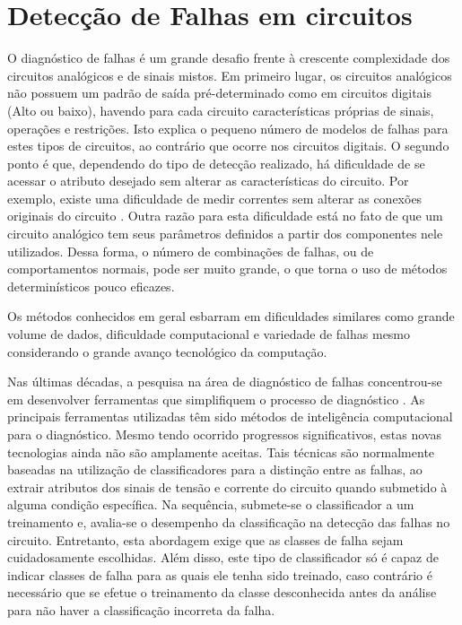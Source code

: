 
\chapter{Detecção de Falhas em circuitos}

O diagnóstico de falhas é um grande desafio frente à crescente complexidade dos circuitos analógicos e de sinais mistos. Em primeiro lugar, os circuitos analógicos não possuem um padrão de saída pré-determinado como em circuitos digitais (Alto ou baixo), havendo para cada circuito características próprias de sinais, operações e restrições. Isto explica o pequeno número de modelos de falhas para estes tipos de circuitos, ao contrário que ocorre nos circuitos digitais. O segundo ponto é que, dependendo do tipo de detecção realizado, há dificuldade de se acessar o atributo desejado sem alterar as características do circuito. Por exemplo, existe uma dificuldade de medir correntes sem alterar as conexões originais do circuito \cite{BANDLER}. Outra razão para esta dificuldade está no fato de que um circuito analógico tem seus parâmetros definidos a partir dos componentes nele utilizados. Dessa forma, o número de combinações de falhas, ou de comportamentos normais, pode ser muito grande, o que torna o uso de métodos determinísticos pouco eficazes.


Os métodos conhecidos em geral esbarram em dificuldades similares como grande volume de dados, dificuldade computacional e  variedade de falhas mesmo considerando o grande avanço tecnológico da computação\cite{DUHAMEL}.

Nas últimas décadas, a pesquisa na área de diagnóstico de falhas concentrou-se em desenvolver ferramentas que simplifiquem o processo de diagnóstico \cite{FENTON}. As principais ferramentas utilizadas têm sido métodos de inteligência computacional para o diagnóstico. Mesmo tendo ocorrido progressos significativos, estas novas tecnologias ainda não são amplamente aceitas. Tais técnicas são normalmente baseadas na utilização de classificadores para a distinção entre as falhas, ao extrair atributos dos sinais de tensão e corrente do circuito quando submetido à alguma condição específica. Na sequência, submete-se o classificador a um treinamento e, avalia-se o desempenho da classificação na detecção das falhas no circuito. Entretanto, esta abordagem exige que as classes de falha sejam cuidadosamente escolhidas. Além disso, este tipo de classificador só é capaz de indicar classes de falha para as quais ele tenha sido treinado, caso contrário é necessário que se efetue o treinamento da classe desconhecida antes da análise para não haver a classificação incorreta da falha.

